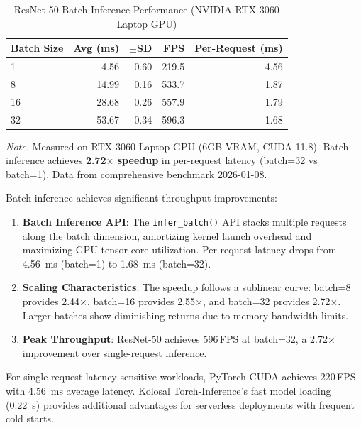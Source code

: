 \documentclass[10pt,twocolumn,a4paper]{article}
\theoremstyle{definition}
\theoremstyle{plain}
\newcommand{\timesX}[1]{#1$\times$}
\newcommand{\fpssuffix}{\,FPS}
\begin{document}
\begin{table}[t]
\centering
\caption{ResNet-50 Batch Inference Performance (NVIDIA RTX 3060 Laptop GPU)}
\label{tab:latency_gpu}
\scriptsize
\setlength{\tabcolsep}{3pt}
\begin{tabular}{@{}lrrrr@{}}
\toprule
\textbf{Batch Size} & \textbf{Avg (ms)} & \textbf{$\pm$SD} & \textbf{FPS} & \textbf{Per-Request (ms)} \\
\midrule
1 & 4.56 & 0.60 & 219.5 & 4.56 \\
8 & 14.99 & 0.16 & 533.7 & 1.87 \\
16 & 28.68 & 0.26 & 557.9 & 1.79 \\
32 & 53.67 & 0.34 & 596.3 & 1.68 \\
\bottomrule
\end{tabular}

\vspace{0.5em}
\noindent\textit{Note.} Measured on RTX 3060 Laptop GPU (6GB VRAM, CUDA 11.8). Batch inference achieves \textbf{\timesX{2.72} speedup} in per-request latency (batch=32 vs batch=1). Data from comprehensive benchmark 2026-01-08.
\end{table}

Batch inference achieves significant throughput improvements:

\begin{enumerate}
    \item \textbf{Batch Inference API}: The \texttt{infer\_batch()} API stacks multiple requests along the batch dimension, amortizing kernel launch overhead and maximizing GPU tensor core utilization. Per-request latency drops from \SI{4.56}{\milli\second} (batch=1) to \SI{1.68}{\milli\second} (batch=32).
    
    \item \textbf{Scaling Characteristics}: The speedup follows a sublinear curve: batch=8 provides \timesX{2.44}, batch=16 provides \timesX{2.55}, and batch=32 provides \timesX{2.72}. Larger batches show diminishing returns due to memory bandwidth limits.
    
    \item \textbf{Peak Throughput}: ResNet-50 achieves \num{596}\fpssuffix{} at batch=32, a \timesX{2.72} improvement over single-request inference.
\end{enumerate}

For single-request latency-sensitive workloads, PyTorch CUDA achieves \num{220}\fpssuffix{} with \SI{4.56}{\milli\second} average latency. Kolosal Torch-Inference's fast model loading (\SI{0.22}{\second}) provides additional advantages for serverless deployments with frequent cold starts.
\end{document}
